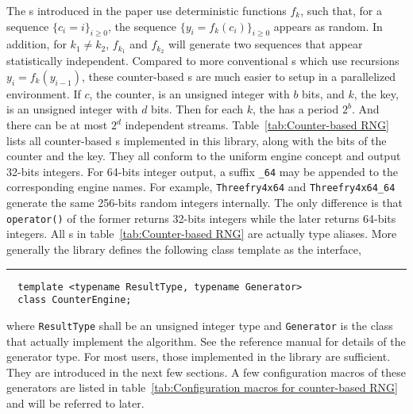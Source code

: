 The \rng{}s introduced in the paper use deterministic functions $f_k$, such
that, for a sequence $\{c_i = i\}_{i\ge0}$, the sequence $\{y_i =
f_k(c_i)\}_{i\ge0}$ appears as random. In addition, for $k_1 \ne k_2$,
$f_{k_1}$ and $f_{k_2}$ will generate two sequences that appear statistically
independent. Compared to more conventional \rng{}s which use recursions $y_i =
f_k(y_{i - 1})$, these counter-based \rng{}s are much easier to setup in a
parallelized environment. If $c$, the counter, is an unsigned integer with $b$
bits, and $k$, the key, is an unsigned integer with $d$ bits. Then for each
$k$, the \rng has a period $2^b$. And there can be at most $2^d$ independent
streams. Table~\ref{tab:Counter-based RNG} lists all counter-based \rng{}s
implemented in this library, along with the bits of the counter and the key.
They all conform to the \cppoo uniform \rng engine concept and output 32-bits
integers. For 64-bits integer output, a suffix \verb|_64| may be appended to
the corresponding \rng engine names. For example, \verb|Threefry4x64| and
\verb|Threefry4x64_64| generate the same 256-bits random integers internally.
The only difference is that \verb|operator()| of the former returns 32-bits
integers while the later returns 64-bits integers. All \rng{}s in
table~\ref{tab:Counter-based RNG} are actually type aliases. More generally the
library defines the following class template as the interface,
\hrule
\begin{Verbatim}
  template <typename ResultType, typename Generator>
  class CounterEngine;
\end{Verbatim}
where \verb|ResultType| shall be an unsigned integer type and \verb|Generator|
is the class that actually implement the algorithm. See the reference manual
for details of the generator type. For most users, those implemented in the
library are sufficient. They are introduced in the next few sections. A few
configuration macros of these generators are listed in
table~\ref{tab:Configuration macros for counter-based RNG} and will be referred
to later.

